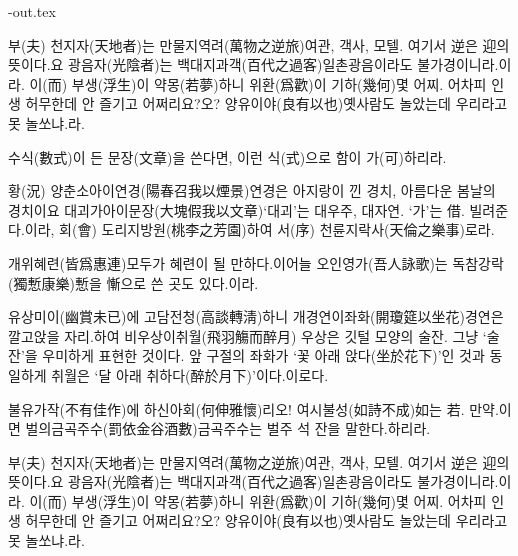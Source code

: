 \documentclass[a4paper,12pt,itemph,footnote]{oblivoir}
\begin{document}
\begin{tcbverbatimwrite}{\jobname-out.tex}
\begin{grruby}
부(夫) 천지자(天地者)는 만물지역려(萬物之逆旅){여관, 객사, 모텔.
 여기서 逆은 迎의 뜻이다.}요
광음자(光陰者)는 백대지과객(百代之過客){일촌광음이라도 불가경이니라.}이라.
이(而) 부생(浮生)이 약몽(若夢)하니 위환(爲歡)이 
기하(幾何){몇 어찌. 어차피 인생 허무한데 안 즐기고 어쩌리요?}오?
양유이야(良有以也){옛사람도 놀았는데 우리라고 못 놀쏘냐.}라.
\end{grruby}

\begin{grruby}
수식(數式)이 든 문장(文章)을 쓴다면,
이런 식(式)으로 함이 가(可)하리라.
\end{grruby}


\begin{grrubypars}
황(況) 양춘소아이연경(陽春召我以煙景){연경은 아지랑이 낀 경치, 아름다운 봄날의 경치}이요
대괴가아이문장(大塊假我以文章){`대괴'는 대우주, 대자연. `가'는 借. 빌려준다.}이라,
회(會) 도리지방원(桃李之芳園)하여 서(序) 천륜지락사(天倫之樂事)로라.

 개위혜련(皆爲惠連){모두가 혜련이 될 만하다.}이어늘
오인영가(吾人詠歌)는 독참강락(獨慙康樂){慙을 慚으로 쓴 곳도 있다.}이라.

\jiwon[13]
\OffStuff{\jiwon[15]}
\jiwon[16]

유상미이(幽賞未已)에 고담전청(高談轉淸)하니
개경연이좌화(開瓊筵以坐花){경연은 깔고앉을 자리.}하여
비우상이취월(飛羽觴而醉月)%
{우상은 깃털 모양의 술잔. 그냥 `술잔'을 우미하게 표현한 것이다.
 앞 구절의 좌화가 `꽃 아래 앉다(坐於花下)'인 것과 동일하게
 취월은 `달 아래 취하다(醉於月下)'이다.}이로다.

불유가작(不有佳作)에 하신아회(何伸雅懷)리오!
여시불성(如詩不成){如는 若. 만약.}이면
벌의금곡주수(罰依金谷酒數){금곡주수는 벌주 석 잔을 말한다.}하리라.
\end{grrubypars}
\end{tcbverbatimwrite}

\begin{grruby}
부(夫)
천지자(天地者)는 만물지역려(萬物之逆旅){여관, 객사, 모텔. 여기서 逆은 迎의 뜻이다.}요
광음자(光陰者)는 백대지과객(百代之過客){일촌광음이라도 불가경이니라.}이라.
이(而) 부생(浮生)이 약몽(若夢)하니 위환(爲歡)이 
기하(幾何){몇 어찌. 어차피 인생 허무한데 안 즐기고 어쩌리요?}오?
양유이야(良有以也){옛사람도 놀았는데 우리라고 못 놀쏘냐.}라.
\end{grruby}
\end{document}
